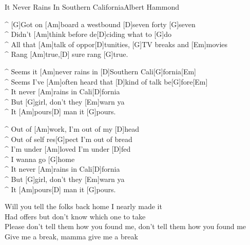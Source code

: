 \begin{song}{It Never Rains In Southern California}{Albert Hammond}

\begin{guitar}
^ [G]Got on [Am]board a westbound [D]seven forty [G]seven\\
^ Didn't [Am]think before de[D]ciding what to [G]do\\
^ All that [Am]talk of oppor[D]tunities, [G]TV breaks and [Em]movies\\
^ Rang [Am]true,[D] sure rang [G]true.\\
\end{guitar}

\begin{guitar}
^ Seems it [Am]never rains in [D]Southern Cali[G]fornia[Em]\\
^ Seems I've [Am]often heard that [D]kind of talk be[G]fore[Em]\\
^ It never [Am]rains in Cali[D]fornia\\
^ But [G]girl, don't they [Em]warn ya\\
^ It [Am]pours[D] man it [G]pours.\\
\end{guitar}

\begin{guitar}
^ Out of [Am]work, I'm out of my [D]head\\
^ Out of self res[G]pect I'm out of bread\\
^ I'm under [Am]loved I'm under [D]fed\\
^ I wanna go [G]home\\
^ It never [Am]rains in Cali[D]fornia\\
^ But [G]girl, don't they [Em]warn ya\\
^ It [Am]pours[D] man it [G]pours.\\
\end{guitar}

\begin{guitar}
Will you tell the folks back home I nearly made it\\
Had offers but don't know which one to take\\
Please don't tell them how you found me, don't tell them how you found me \\
Give me a break, mamma give me a break\\
\end{guitar}

\end{song}
